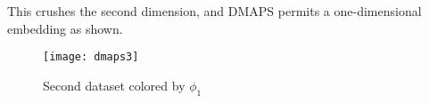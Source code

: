 \documentclass[11pt]{article}
\begin{document}
This crushes the second dimension, and DMAPS permits a one-dimensional embedding as shown.

\begin{figure}[htbp]
  \centering
  \texttt{[image: dmaps3]}
  \caption{Second dataset colored by $\phi_1$}
  \label{label}
\end{figure}

% 
% 
\end{document}
